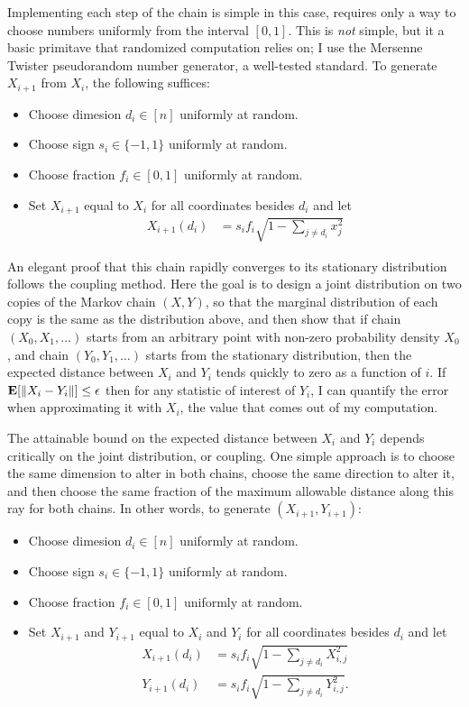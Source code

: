 Implementing each step of the chain is simple in this case, requires
only a way to choose numbers uniformly from the interval $[0,1]$.  This
is \emph{not} simple, but it a basic primitave that randomized
computation relies on; I use the Mersenne Twister pseudorandom number
generator, a well-tested standard.\cite{Matsumoto_Mersenne_1998}
To generate $X_{i+1}$ from $X_i$, the following suffices:
\begin{itemize}
\item Choose dimesion $d_i \in [n]$ uniformly at random.
\item Choose sign $s_i \in \{-1, 1\}$ uniformly at random.
\item Choose fraction $f_i \in [0,1]$ uniformly at random.
\item Set $X_{i+1}$ equal to $X_i$ for all coordinates besides $d_i$ and let
\begin{align*}
X_{i+1}(d_i) &= s_i f_i \sqrt{1 - \sum_{j\neq d_i} x_j^2}
\end{align*}
\end{itemize}

An elegant proof that this chain rapidly converges to its stationary
distribution follows the coupling method.\cite{Lindval_The_Coupling_Method} Here the goal is to design a joint distribution on
two copies of the Markov chain $(X, Y)$, so that the marginal
distribution of each copy is the same as the distribution above, and
then show that if chain $(X_0, X_1, \ldots)$ starts from an arbitrary
point with non-zero probability density $X_0$, and chain $(Y_0, Y_1,
\ldots)$ starts from the stationary distribution, then the expected
distance between $X_i$ and $Y_i$ tends quickly to zero as a function
of $i$.  If $\mathbf{E}[\|X_i - Y_i\|] \leq \epsilon$ then for any statistic of
interest of $Y_i$, I can quantify the error when approximating it with
$X_i$, the value that comes out of my computation.

The attainable bound on the expected distance between $X_i$ and $Y_i$
depends critically on the joint distribution, or coupling.  One simple
approach is to choose the same dimension to alter in both chains,
choose the same direction to alter it, and then choose the same
fraction of the maximum allowable distance along this ray for both
chains.  In other words, to generate $(X_{i+1}, Y_{i+1})$:
\begin{itemize}
\item Choose dimesion $d_i \in [n]$ uniformly at random.
\item Choose sign $s_i \in \{-1, 1\}$ uniformly at random.
\item Choose fraction $f_i \in [0,1]$ uniformly at random.
\item Set $X_{i+1}$ and $Y_{i+1}$ equal to $X_i$ and $Y_i$ for all coordinates besides $d_i$ and let
\begin{align*}
X_{i+1}(d_i) &= s_i f_i \sqrt{1 - \sum_{j\neq d_i} X_{i,j}^2}\\
Y_{i+1}(d_i) &= s_i f_i \sqrt{1 - \sum_{j\neq d_i} Y_{i,j}^2}.
\end{align*}
\end{itemize}

